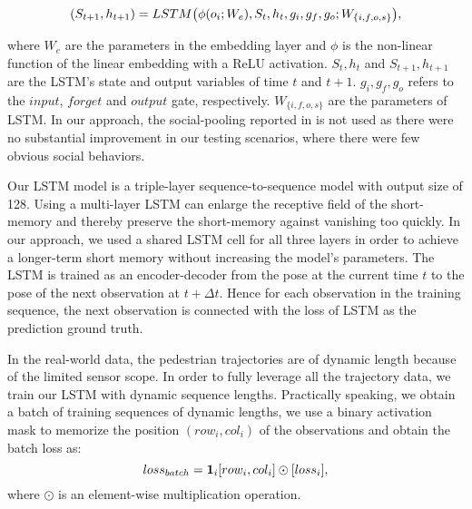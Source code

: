 \documentclass[letterpaper, 10 pt, conference]{ieeeconf}  %
\begin{document}
\begin{equation}
\small
(S_{t+1}, h_{t+1}) = LSTM\big(\phi(o_i; W_e), S_{t}, h_{t}, g_i, g_f, g_o; W_{\{i,f,o,s\}} \big),
\end{equation}

\noindent where  $W_e$ are the parameters in the embedding layer and $\phi$ is the non-linear function of the linear embedding with a ReLU activation. $S_{t}, h_{t}$ and $S_{t+1}, h_{t+1}$ are the LSTM's state and output variables of time $t$ and $t+1$. $g_i, g_f, g_o$ refers to the $input$, $forget$ and $output$ gate, respectively. $W_{\{i,f,o,s\}}$ are the parameters of LSTM. In our approach, the social-pooling reported in \cite{social-lstm} is not used as there were no substantial improvement in our testing scenarios, where there were few obvious social behaviors. 


Our LSTM model is a triple-layer sequence-to-sequence model with output size of 128. Using a multi-layer LSTM can enlarge the receptive field of the short-memory and thereby preserve the short-memory against vanishing too quickly. In our approach, we used a shared LSTM cell for all three layers in order to achieve a longer-term short memory without increasing the model's parameters. The LSTM is trained as an encoder-decoder from the pose at the current time $t$ to the pose of the next observation at $t+\Delta t$. Hence for each observation in the training sequence, the next observation is connected with the loss of LSTM as the prediction ground truth.

In the real-world data, the pedestrian trajectories are of dynamic length because of the limited sensor scope. In order to fully leverage all the trajectory data, we train our LSTM with dynamic sequence lengths. Practically speaking, we obtain a batch of training sequences of dynamic lengths, we use a binary activation mask to memorize the position $(row_i, col_i)$ of the observations and 
obtain the batch loss as:
\begin{equation}
loss_{batch} = \mathcal{\bf 1}_{i}[row_i, col_i] \odot [loss_i],
\end{equation}
\noindent where $\odot$ is an element-wise multiplication operation.
\end{document}
